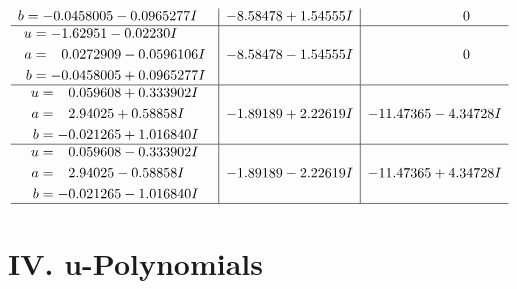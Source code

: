 \documentclass[1p]{elsarticle_modified}
\theoremstyle{definition}
\begin{document}
$$\begin{array}{c|c|c}
\begin{aligned}
b &= -0.0458005 - 0.0965277 I\end{aligned}
 & -8.58478 + 1.54555 I & \phantom{-0.000000 } 0 \\ \hline\begin{aligned}
u &= -1.62951 - 0.02230 I \\
a &= \phantom{-}0.0272909 - 0.0596106 I \\
b &= -0.0458005 + 0.0965277 I\end{aligned}
 & -8.58478 - 1.54555 I & \phantom{-0.000000 } 0 \\ \hline\begin{aligned}
u &= \phantom{-}0.059608 + 0.333902 I \\
a &= \phantom{-}2.94025 + 0.58858 I \\
b &= -0.021265 + 1.016840 I\end{aligned}
 & -1.89189 + 2.22619 I & -11.47365 - 4.34728 I \\ \hline\begin{aligned}
u &= \phantom{-}0.059608 - 0.333902 I \\
a &= \phantom{-}2.94025 - 0.58858 I \\
b &= -0.021265 - 1.016840 I\end{aligned}
 & -1.89189 - 2.22619 I & -11.47365 + 4.34728 I\\
 \hline 
 \end{array}$$\newpage
\newpage\renewcommand{\arraystretch}{1}
\centering \section*{ IV. u-Polynomials}
\end{document}
